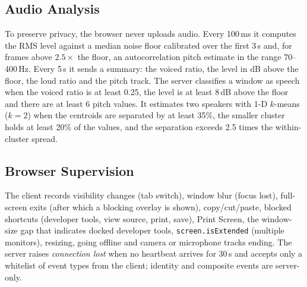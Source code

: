 \documentclass[conference]{IEEEtran}
\begin{document}
\subsection{Audio Analysis}
To preserve privacy, the browser never uploads audio. Every 100\,ms it computes the RMS level against a median noise floor calibrated over the first 3\,s and, for frames above $2.5\times$ the floor, an autocorrelation pitch estimate in the range 70--400\,Hz. Every 5\,s it sends a summary: the voiced ratio, the level in dB above the floor, the loud ratio and the pitch track. The server classifies a window as speech when the voiced ratio is at least 0.25, the level is at least 8\,dB above the floor and there are at least 6 pitch values. It estimates two speakers with 1-D $k$-means ($k{=}2$) when the centroids are separated by at least 35\%, the smaller cluster holds at least 20\% of the values, and the separation exceeds 2.5 times the within-cluster spread.

\subsection{Browser Supervision}
The client records visibility changes (tab switch), window blur (focus lost), full-screen exits (after which a blocking overlay is shown), copy/cut/paste, blocked shortcuts (developer tools, view source, print, save), Print Screen, the window-size gap that indicates docked developer tools, \texttt{screen.isExtended} (multiple monitors), resizing, going offline and camera or microphone tracks ending. The server raises \emph{connection lost} when no heartbeat arrives for 30\,s and accepts only a whitelist of event types from the client; identity and composite events are server-only.
\end{document}
